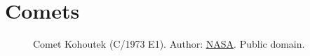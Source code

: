 

\chapter{Comets}

\begin{figure}[ht]
        \captionsetup{width=\linewidth}
        \caption{\footnotesize Comet Kohoutek (C/1973 E1). Author: \href{https://pt.m.wikipedia.org/wiki/Ficheiro:Comet_Kohoutek_(S74-17688).jpg}{NASA}. Public domain.}
\end{figure}

